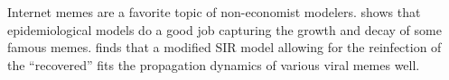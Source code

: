 

Internet memes are a favorite topic of non-economist modelers. \href{https://github.com/iworld1991/EpiExp/blob/master/Literature/bauckhage2011insights.pdf}{\cite{bauckhage2011insights}} shows that epidemiological models do a good job capturing the growth and decay of some famous memes. \cite{wang2011epidemiological} finds that a modified SIR model allowing for the reinfection of the ``recovered'' fits  the propagation dynamics of various viral memes well.  %




